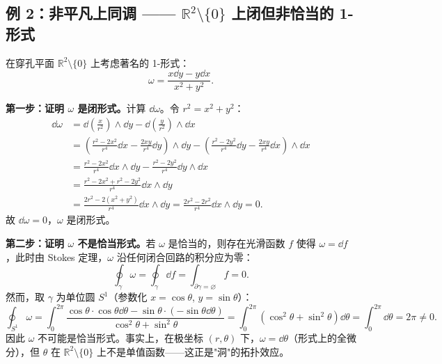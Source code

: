 \subsection{例 2：非平凡上同调 —— $\mathbb{R}^2\setminus\{0\}$ 上闭但非恰当的 1-形式}

在穿孔平面 $\mathbb{R}^2 \setminus \{0\}$ 上考虑著名的 1-形式：
\begin{equation}
    \omega = \frac{x \dd y - y \dd x}{x^2 + y^2}.
\end{equation}

\textbf{第一步：证明 $\omega$ 是闭形式。}计算 $\dd\omega$。令 $r^2 = x^2 + y^2$：
\begin{align}
    \dd\omega &= \dd\!\left(\frac{x}{r^2}\right) \wedge \dd y - \dd\!\left(\frac{y}{r^2}\right) \wedge \dd x \nonumber\\
    &= \left(\frac{r^2 - 2x^2}{r^4} \dd x - \frac{2xy}{r^4} \dd y\right) \wedge \dd y
     - \left(\frac{r^2 - 2y^2}{r^4} \dd y - \frac{2xy}{r^4} \dd x\right) \wedge \dd x \nonumber\\
    &= \frac{r^2 - 2x^2}{r^4} \dd x \wedge \dd y - \frac{r^2 - 2y^2}{r^4} \dd y \wedge \dd x \nonumber\\
    &= \frac{r^2 - 2x^2 + r^2 - 2y^2}{r^4} \dd x \wedge \dd y \nonumber\\
    &= \frac{2r^2 - 2(x^2+y^2)}{r^4} \dd x \wedge \dd y = \frac{2r^2 - 2r^2}{r^4} \dd x \wedge \dd y = 0.
\end{align}
故 $\dd\omega = 0$，$\omega$ 是闭形式。

\textbf{第二步：证明 $\omega$ 不是恰当形式。}若 $\omega$ 是恰当的，则存在光滑函数 $f$ 使得 $\omega = \dd f$，此时由 Stokes 定理，$\omega$ 沿任何闭合回路的积分应为零：
\begin{equation}
    \oint_\gamma \omega = \oint_\gamma \dd f = \int_{\partial\gamma = \varnothing} f = 0.
\end{equation}
然而，取 $\gamma$ 为单位圆 $S^1$（参数化 $x = \cos\theta$, $y = \sin\theta$）：
\begin{equation}
    \oint_{S^1} \omega = \int_0^{2\pi} \frac{\cos\theta \cdot \cos\theta \dd\theta - \sin\theta \cdot (-\sin\theta \dd\theta)}{\cos^2\theta + \sin^2\theta}
    = \int_0^{2\pi} (\cos^2\theta + \sin^2\theta) \dd\theta = \int_0^{2\pi} \dd\theta = 2\pi \neq 0.
\end{equation}
因此 $\omega$ 不可能是恰当形式。事实上，在极坐标 $(r, \theta)$ 下，$\omega = \dd\theta$（形式上的全微分），但 $\theta$ 在 $\mathbb{R}^2 \setminus \{0\}$ 上不是单值函数——这正是"洞"的拓扑效应。

